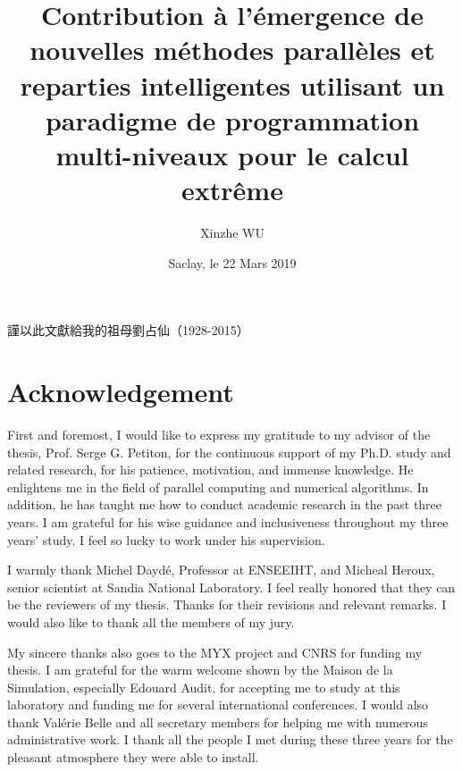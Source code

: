 \documentclass{xinzhewu}
\title{\Large \textrm{Contribution \`a l’\'emergence de nouvelles m\'ethodes parall\`eles et reparties intelligentes utilisant un paradigme de programmation multi-niveaux pour le calcul extr\^eme}}
\author{Xinzhe WU}
\date{Saclay, le 22 Mars 2019}
\makeatletter
\newcommand*\bigcdot{\mathpalette\bigcdot@{.5}}
\newcommand*\bigcdot@[2]{\mathbin{\vcenter{\hbox{\scalebox{#2}{$\m@th#1\bullet$}}}}}
\newenvironment{dedication}
{\clearpage           %
	\thispagestyle{empty}%
	\vspace*{\stretch{1}}%
	\itshape             %
	\raggedleft          %
}
{\par %
	\vspace{\stretch{3}} %
	\clearpage           %
}
\makeatother
\begin{document}
\maketitle
 
\clearemptydoublepage
\begin{dedication}
	\normalsize
	
	\vspace{0.2in}
	\begin{CJK*}{UTF8}{bsmi}
		{
			\large
			謹以此文獻給我的祖母劉占仙（1928-2015）}
	\end{CJK*}

\iffalse
\begin{textblock*}{\textwidth}(6cm,4cm)
	
	\begin{CJK*}{UTF8}{bsmi}
		\centerline{{\CJKfamily{bkai}戊戌年 $\bigcdot$小寒}}
		\centerline{{\CJKfamily{bkai}巴黎城}}
		\centerline{{\CJKfamily{bkai}歡鵲壘新巢}}
	\end{CJK*}
\end{textblock*}
\fi

\end{dedication}

\clearemptydoublepage

\chapter*{Acknowledgement}
\thispagestyle{empty}

First and foremost, I would like to express my gratitude to my advisor of the thesis, Prof. Serge G. Petiton, for the continuous support of my Ph.D. study and related research, for his patience, motivation, and immense knowledge. He enlightens me in the field of parallel computing and numerical algorithms. In addition, he has taught me how to conduct academic research in the past three years. I am grateful for his wise guidance and inclusiveness throughout my three years' study. I feel so lucky to work under his supervision.

I warmly thank Michel Dayd\'e, Professor at ENSEEIHT, and Micheal Heroux, senior scientist at Sandia National Laboratory. I feel really honored that they can be the reviewers of my thesis. Thanks for their revisions and relevant remarks. I would also like to thank all the members of my jury.

My sincere thanks also goes to the MYX project and CNRS for funding my thesis. I am grateful for the warm welcome shown by the Maison de la Simulation, especially Edouard Audit, for accepting me to study at this laboratory and funding me for several international conferences. I would also thank Val\'erie Belle and all secretary members for helping me with numerous administrative work. I thank all the people I met during these three years for the pleasant atmosphere they were able to install. 
\end{document}
